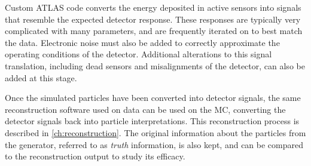 Custom \ac{ATLAS} code converts the energy deposited in active sensors into signals that resemble the expected detector response. These responses are typically very complicated with many parameters, and are frequently iterated on to best match the data. Electronic noise must also be added to correctly approximate the operating conditions of the detector. Additional alterations to this signal translation, including dead sensors and misalignments of the detector, can also be added at this stage. 

Once the simulated particles have been converted into detector signals, the same reconstruction software used on data can be used on the \ac{MC}, converting the detector signals back into particle interpretations. This reconstruction process is described in \autoref{ch:reconstruction}. The original information about the particles from the generator, referred to as \textit{truth} information, is also kept, and can be compared to the reconstruction output to study its efficacy.




